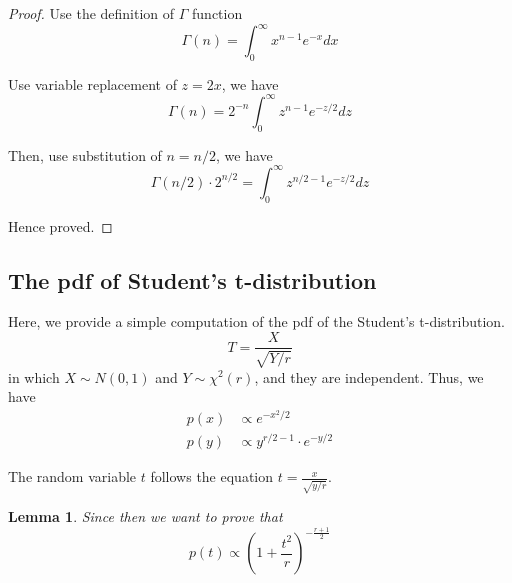 \documentclass[a4paper]{article}
\newtheorem{lemma}{Lemma}[section]
\begin{document}
\begin{proof}
    Use the definition of $\Gamma$ function
    \begin{equation*}
        \Gamma(n) = \int_0^\infty x^{n-1} e^{-x} dx
    \end{equation*}

    Use variable replacement of $z = 2x$, we have
    \begin{equation*}
        \Gamma(n) = 2^{-n} \int_0^\infty z^{n-1} e^{-z/2} dz
    \end{equation*}

    Then, use substitution of $n = n/2$, we have
    \begin{equation*}
        \Gamma(n/2) \cdot 2^{n/2} = \int_0^\infty z^{n/2-1} e^{-z/2} dz
    \end{equation*}

    Hence proved.

\end{proof}

\subsection{The pdf of Student's t-distribution}

Here, we provide a simple computation of the pdf of the Student's t-distribution.
\begin{equation*}
    T=\frac{X}{\sqrt{Y/r}}
\end{equation*}
in which $X \sim N(0, 1)$ and $Y \sim \chi^2(r)$, and they are independent.
Thus, we have
\begin{equation*}
    \begin{align}
        p(x) & \propto e^{-x^2/2}               \\
        p(y) & \propto y^{r/2-1} \cdot e^{-y/2}
    \end{align}
\end{equation*}

The random variable $t$ follows the equation $t=\frac{x}{\sqrt{y/r}}$.

\begin{lemma} \label{lemma: Compute the pdf of Student's t-distribution}
    Since then we want to prove that
    \begin{equation*}
        p(t) \propto (1+\frac{t^2}{r})^{-\frac{r+1}{2}}
    \end{equation*}

\end{lemma}
\end{document}
